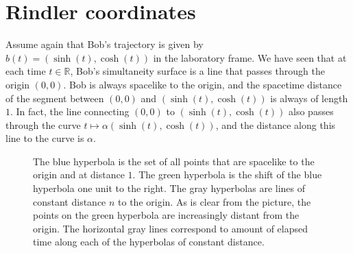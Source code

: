 \documentclass[tikz,border=10pt,fleqn]{article}
\theoremstyle{definition}
\begin{document}
\section{Rindler coordinates}

Assume again that Bob's trajectory is given by
$b(t)=(\sinh (t),\cosh (t))$ in the laboratory frame. We have seen
that at each time $t\in\mathbb{R}$, Bob's simultaneity surface is a
line that passes through the origin $(0,0)$. Bob is always spacelike
to the origin, and the spacetime distance of the segment between
$(0,0)$ and $(\sinh(t) ,\cosh (t))$ is always of length $1$. In fact,
the line connecting $(0,0)$ to $(\sinh (t),\cosh (t))$ also passes
through the curve $t\mapsto \alpha (\sinh (t),\cosh (t))$, and the
distance along this line to the curve is $\alpha$.

\begin{figure}[ht]
\caption{The blue hyperbola is the set of all points that are
  spacelike to the origin and at distance $1$. The green hyperbola is
  the shift of the blue hyperbola one unit to the right. The gray
  hyperbolas are lines of constant distance $n$ to the origin. As is
  clear from the picture, the points on the green hyperbola are
  increasingly distant from the origin. The horizontal gray lines
  correspond to amount of elapsed time along each of the hyperbolas of
  constant distance.}
\end{figure}
\end{document}
